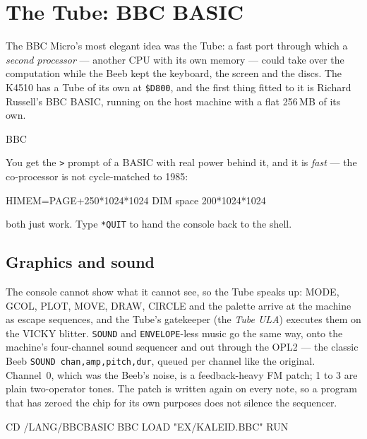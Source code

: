 \chapter{The Tube: BBC BASIC}\label{cha:tube}

The BBC Micro's most elegant idea was the Tube: a fast port through which a
\emph{second processor} --- another CPU with its own memory --- could take
over the computation while the Beeb kept the keyboard, the screen and the
discs. The K4510 has a Tube of its own at \texttt{\$D800}, and the first
thing fitted to it is Richard Russell's BBC BASIC, running on the host
machine with a flat 256\,MB of its own.

\begin{type}
BBC
\end{type}

You get the \verb|>| prompt of a BASIC with real power behind it, and it
is \emph{fast} --- the co-processor is not cycle-matched to 1985:

\begin{type}
HIMEM=PAGE+250*1024*1024
DIM space 200*1024*1024
\end{type}

both just work. Type \verb|*QUIT| to hand the console back to the shell.

\section{Graphics and sound}
The console cannot show what it cannot see, so the Tube speaks up: MODE,
GCOL, PLOT, MOVE, DRAW, CIRCLE and the palette arrive at the machine as
escape sequences, and the Tube's gatekeeper (the \emph{Tube ULA}) executes
them on the VICKY blitter. \verb|SOUND| and \verb|ENVELOPE|-less music go
the same way, onto the machine's four-channel sound sequencer and out
through the OPL2 --- the classic Beeb \texttt{SOUND chan,amp,pitch,dur},
queued per channel like the original. Channel~0, which was the Beeb's
noise, is a feedback-heavy FM patch; 1 to 3 are plain two-operator tones.
The patch is written again on every note, so a program that has zeroed
the chip for its own purposes does not silence the sequencer.

\begin{type}
CD /LANG/BBCBASIC
BBC
LOAD "EX/KALEID.BBC"
RUN
\end{type}


